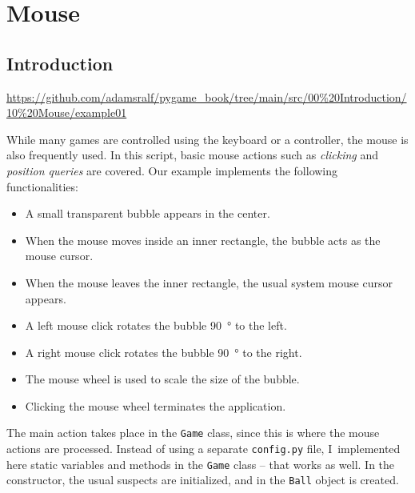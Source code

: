 \newpage
\section{Mouse}\label{secMaus}
\subsection{Introduction}
\begin{diskbox}
	\url{https://github.com/adamsralf/pygame_book/tree/main/src/00%20Introduction/10%20Mouse/example01}
\end{diskbox}

While many games are controlled using the keyboard or a controller, the mouse is also frequently used. In this script, basic mouse actions such as \emph{clicking} and \emph{position queries} are covered. Our example implements the following functionalities:
\begin{itemize}
	\item A small transparent bubble appears in the center.
	\item When the mouse moves inside an inner rectangle, the bubble acts as the mouse cursor.
	\item When the mouse leaves the inner rectangle, the usual system mouse cursor appears.
	\item A left mouse click rotates the bubble \SI{90}{\degree} to the left.
	\item A right mouse click rotates the bubble \SI{90}{\degree} to the right.
	\item The mouse wheel is used to scale the size of the bubble.
	\item Clicking the mouse wheel terminates the application.
\end{itemize}


The main action takes place in the \texttt{Game} class, since this is where the mouse actions are processed. Instead of using a separate \texttt{config.py} file, I~implemented here static variables and methods in the \texttt{Game} class -- that works as well.  In the constructor, the usual suspects are initialized, and in  the \texttt{Ball} object is created.



